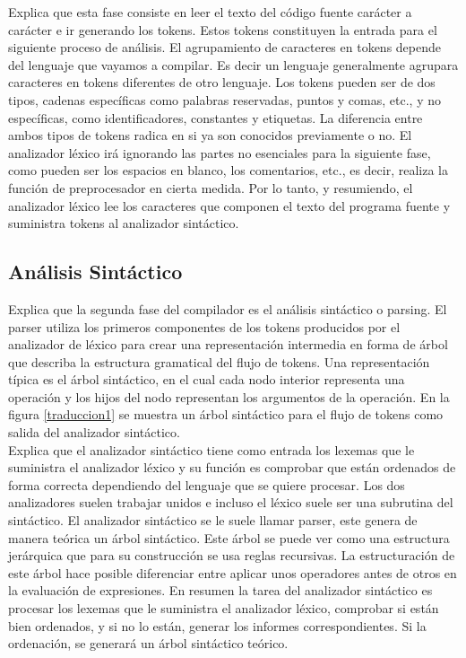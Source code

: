\cite{catalan2010compiladores} Explica que esta fase consiste en leer el texto del código fuente carácter a carácter e ir generando los tokens. Estos tokens constituyen la entrada para el siguiente proceso de análisis. El agrupamiento de caracteres en tokens depende del lenguaje que vayamos a compilar. Es decir un lenguaje generalmente agrupara caracteres en tokens diferentes de otro lenguaje. Los tokens pueden ser de dos tipos, cadenas específicas como palabras reservadas, puntos y comas, etc., y no específicas, como identificadores, constantes y etiquetas. La
diferencia entre ambos tipos de tokens radica en si ya son conocidos previamente o no. El analizador léxico irá ignorando las partes no esenciales para la siguiente fase, como pueden ser los espacios en blanco, los comentarios, etc., es decir, realiza la función de preprocesador en cierta medida. Por lo tanto, y resumiendo, el analizador léxico lee los caracteres que componen el texto del programa fuente y suministra tokens al analizador sintáctico.

\subsection{Análisis Sintáctico}
\cite{aho2008compiladores} Explica que la segunda fase del compilador es el análisis sintáctico o parsing. El parser utiliza los primeros componentes de los tokens producidos por el analizador de léxico para crear una representación intermedia en forma de árbol que describa la estructura gramatical del flujo de tokens. Una representación típica es el árbol sintáctico, en el cual cada nodo interior representa una operación y los hijos del nodo representan los argumentos de la operación. En la figura \ref{traduccion1} se muestra un árbol sintáctico para el flujo de tokens como salida del analizador sintáctico.\\

\cite{catalan2010compiladores} Explica que el analizador sintáctico tiene como entrada los lexemas que le suministra el analizador léxico y su función es comprobar que están ordenados de forma correcta dependiendo del lenguaje que se quiere procesar. Los dos analizadores suelen trabajar
unidos e incluso el léxico suele ser una subrutina del sintáctico. El analizador sintáctico se le suele llamar parser, este genera de manera teórica un árbol sintáctico. Este árbol se puede ver como una estructura jerárquica que para su construcción se usa reglas recursivas. La estructuración de este árbol hace posible diferenciar entre aplicar unos operadores antes de otros en la evaluación de expresiones. En resumen la tarea del analizador sintáctico es procesar los lexemas que le suministra el analizador léxico, comprobar si están bien ordenados, y si no lo están, generar los informes correspondientes. Si la ordenación, se generará un árbol sintáctico teórico.

